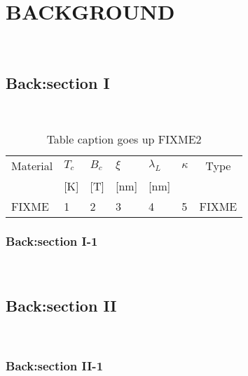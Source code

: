 \chapter{BACKGROUND}
\lipsum[1-4]~\cite{anderson1964hard}

\section{Back:section I}
\lipsum[1-4]~\cite{anderson1964hard}
\begin{table}[htbp]
	\renewcommand{\arraystretch}{1.6}
	\setlength{\tabcolsep}{10pt}
	\caption{Table caption goes up FIXME2}
	\label{tbl3_1}
	\centering
	\begin{tabular}{l l l l l l c}
	\hline\hline
	Material & $T_c$ & $B_c$& $\xi$ & $\lambda_L$ & $\kappa$ & Type \\
	\hfill & [K] & [T] & [nm] & [nm] & \hfill & \hfill \\
	\hline
	FIXME & 1 & 2 & 3 & 4 & 5 & FIXME \\
	\hline\hline
	\end{tabular}
\end{table}

\subsection{Back:section I-1}
\lipsum[1-4]~\cite{anderson1964hard}

\section{Back:section II}
\lipsum[1-4]~\cite{anderson1964hard}

\subsection{Back:section II-1}
\lipsum[1-4]~\cite{anderson1964hard}